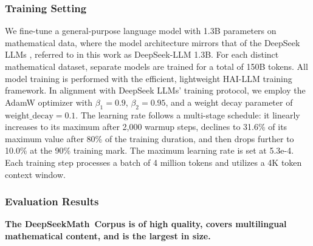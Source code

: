 \begin{itemize}[topsep=0pt]
\subsubsection{Training Setting}
\label{sec:quality-policy}
We fine-tune a general-purpose language model with 1.3B parameters on mathematical data, where the model architecture mirrors that of the DeepSeek LLMs \citep{deepseek-llm}, referred to in this work as DeepSeek-LLM 1.3B. For each distinct mathematical dataset, separate models are trained for a total of 150B tokens. All model training is performed with the efficient, lightweight HAI-LLM \citep{haillm} training framework. In alignment with DeepSeek LLMs' training protocol, we employ the AdamW optimizer \citep{adamW} with $\beta_1=0.9$, $\beta_2=0.95$, and a weight decay parameter of $\mathrm{weight\_decay}=0.1$. The learning rate follows a multi-stage schedule: it linearly increases to its maximum after 2,000 warmup steps, declines to 31.6\% of its maximum value after 80\% of the training duration, and then drops further to 10.0\% at the 90\% training mark. The maximum learning rate is set at 5.3e-4. Each training step processes a batch of 4 million tokens and utilizes a 4K token context window.

\subsubsection{Evaluation Results}

\textbf{The DeepSeekMath~Corpus is of high quality, covers multilingual mathematical content, and is the largest in size.}


\end{itemize}
